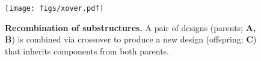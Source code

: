 \begin{figure}[b]
    \centering
    \vspace{-10pt}
    \texttt{[image: figs/xover.pdf]}
    \vspace{-18pt}
    \caption{\textbf{Recombination of substructures.}
    A pair of designs (parents; \textbf{A, B}) is combined via crossover to produce a new design  (offspring; \textbf{C}) that inherits components from both parents.
}
    \label{fig:results-xover}
    \vspace{-8pt}
\end{figure}